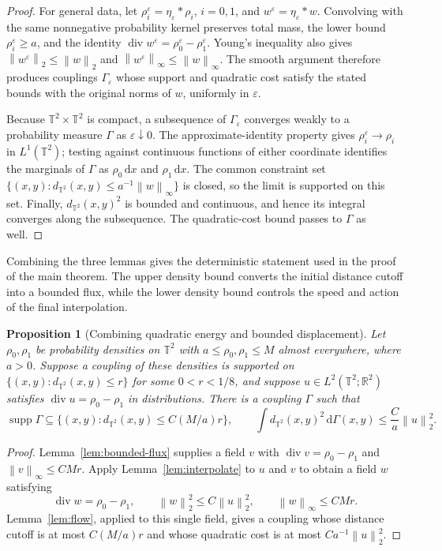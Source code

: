 \documentclass[11pt]{article}
\newcommand{\R}{\mathbb R}
\newcommand{\T}{\mathbb T^2}
\newcommand{\supp}{\operatorname{supp}}
\newcommand{\diver}{\operatorname{div}}
\newcommand{\norm}[1]{\left\lVert #1\right\rVert}
\newcommand{\eps}{\varepsilon}
\newtheorem{proposition}[theorem]{Proposition}
\theoremstyle{remark}
\numberwithin{equation}{section}
\begin{document}
\begin{proof}
For general data, let
\(\rho_i^\eps=\eta_\eps*\rho_i\), \(i=0,1\), and
\(w^\eps=\eta_\eps*w\). Convolving with the same nonnegative
probability kernel preserves total mass, the lower bound
\(\rho_i^\eps\ge a\), and the identity
\(\diver w^\eps=\rho_0^\eps-\rho_1^\eps\).
Young's inequality also gives
\(\norm{w^\eps}_2\le\norm w_2\) and
\(\norm{w^\eps}_\infty\le\norm w_\infty\).
The smooth argument therefore produces couplings \(\Gamma_\eps\)
whose support and quadratic cost satisfy the stated bounds with the
original norms of \(w\), uniformly in \(\eps\).

Because \(\T\times\T\) is compact, a subsequence of
\(\Gamma_\eps\) converges weakly to a probability measure \(\Gamma\)
as \(\eps\downarrow0\). The approximate-identity property gives
\(\rho_i^\eps\to\rho_i\) in \(L^1(\T)\); testing against continuous
functions of either coordinate identifies the marginals of \(\Gamma\)
as \(\rho_0\,\mathrm dx\) and \(\rho_1\,\mathrm dx\).
The common constraint set
\(\{(x,y):d_{\T}(x,y)\le a^{-1}\norm w_\infty\}\) is closed,
so the limit is supported on this set. Finally,
\(d_{\T}(x,y)^2\) is bounded and continuous, and hence its integral
converges along the subsequence. The quadratic-cost bound passes to
\(\Gamma\) as well.
\end{proof}

Combining the three lemmas gives the deterministic statement used in
the proof of the main theorem. The upper density bound converts the
initial distance cutoff into a bounded flux, while the lower density
bound controls the speed and action of the final interpolation.

\begin{proposition}[Combining quadratic energy and bounded displacement]
\label{prop:continuous}
Let \(\rho_0,\rho_1\) be probability densities on \(\T\) with
\(a\le\rho_0,\rho_1\le M\) almost everywhere, where \(a>0\).
Suppose a coupling of these densities is supported on
\(\{(x,y):d_{\T}(x,y)\le r\}\) for some \(0<r<1/8\), and suppose
\(u\in L^2(\T;\R^2)\) satisfies
\(\diver u=\rho_0-\rho_1\) in distributions.
There is a coupling \(\Gamma\) such that
\[
 \supp\Gamma\subseteq
 \{(x,y):d_{\T}(x,y)\le C(M/a)r\},
 \qquad
 \int d_{\T}(x,y)^2\,\mathrm d\Gamma(x,y)
 \le\frac Ca\norm u_2^2.
\]
\end{proposition}

\begin{proof}
Lemma~\ref{lem:bounded-flux} supplies a field \(v\) with
\(\diver v=\rho_0-\rho_1\) and \(\norm v_\infty\le CMr\).
Apply Lemma~\ref{lem:interpolate} to \(u\) and \(v\) to obtain a
field \(w\) satisfying
\[
 \diver w=\rho_0-\rho_1,\qquad
 \norm w_2^2\le C\norm u_2^2,\qquad
 \norm w_\infty\le CMr.
\]
Lemma~\ref{lem:flow}, applied to this single field, gives a coupling
whose distance cutoff is at most \(C(M/a)r\) and whose quadratic
cost is at most \(Ca^{-1}\norm u_2^2\).
\end{proof}
\end{document}
